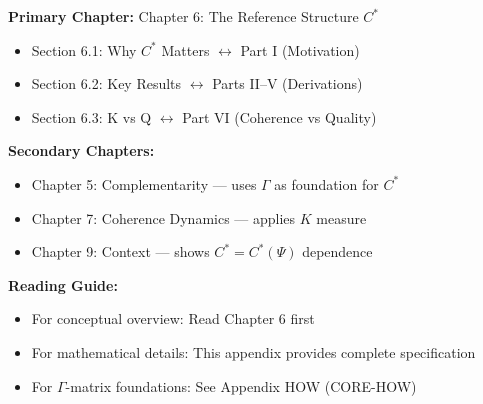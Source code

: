 \begin{tcolorbox}[colback=purple!5!white, colframe=purple!75!black,
    title=\textbf{Chapter Linkages}]

\textbf{Primary Chapter:} Chapter 6: The Reference Structure $C^*$
\begin{itemize}[nosep]
    \item Section 6.1: Why $C^*$ Matters $\leftrightarrow$ Part I (Motivation)
    \item Section 6.2: Key Results $\leftrightarrow$ Parts II--V (Derivations)
    \item Section 6.3: K vs Q $\leftrightarrow$ Part VI (Coherence vs Quality)
\end{itemize}

\textbf{Secondary Chapters:}
\begin{itemize}[nosep]
    \item Chapter 5: Complementarity --- uses $\Gamma$ as foundation for $C^*$
    \item Chapter 7: Coherence Dynamics --- applies $K$ measure
    \item Chapter 9: Context --- shows $C^* = C^*(\Psi)$ dependence
\end{itemize}

\textbf{Reading Guide:}
\begin{itemize}[nosep]
    \item For conceptual overview: Read Chapter 6 first
    \item For mathematical details: This appendix provides complete specification
    \item For $\Gamma$-matrix foundations: See Appendix HOW (CORE-HOW)
\end{itemize}

\end{tcolorbox}


